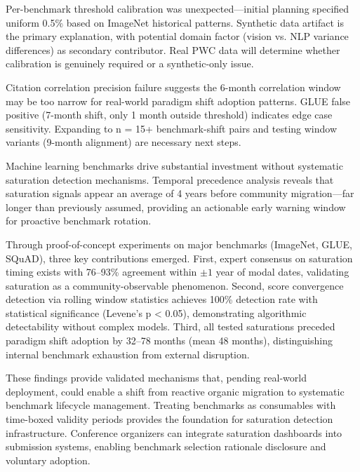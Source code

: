 
Per-benchmark threshold calibration was unexpected---initial planning specified uniform 0.5\% based on ImageNet historical patterns. Synthetic data artifact is the primary explanation, with potential domain factor (vision vs. NLP variance differences) as secondary contributor. Real PWC data will determine whether calibration is genuinely required or a synthetic-only issue.

Citation correlation precision failure suggests the 6-month correlation window may be too narrow for real-world paradigm shift adoption patterns. GLUE false positive (7-month shift, only 1 month outside threshold) indicates edge case sensitivity. Expanding to n = 15+ benchmark-shift pairs and testing window variants (9-month alignment) are necessary next steps.


Machine learning benchmarks drive substantial investment without systematic saturation detection mechanisms. Temporal precedence analysis reveals that saturation signals appear an average of 4 years before community migration---far longer than previously assumed, providing an actionable early warning window for proactive benchmark rotation.

Through proof-of-concept experiments on major benchmarks (ImageNet, GLUE, SQuAD), three key contributions emerged. First, expert consensus on saturation timing exists with 76--93\% agreement within $\pm 1$ year of modal dates, validating saturation as a community-observable phenomenon. Second, score convergence detection via rolling window statistics achieves 100\% detection rate with statistical significance (Levene's p < 0.05), demonstrating algorithmic detectability without complex models. Third, all tested saturations preceded paradigm shift adoption by 32--78 months (mean 48 months), distinguishing internal benchmark exhaustion from external disruption.

These findings provide validated mechanisms that, pending real-world deployment, could enable a shift from reactive organic migration to systematic benchmark lifecycle management. Treating benchmarks as consumables with time-boxed validity periods provides the foundation for saturation detection infrastructure. Conference organizers can integrate saturation dashboards into submission systems, enabling benchmark selection rationale disclosure and voluntary adoption.
